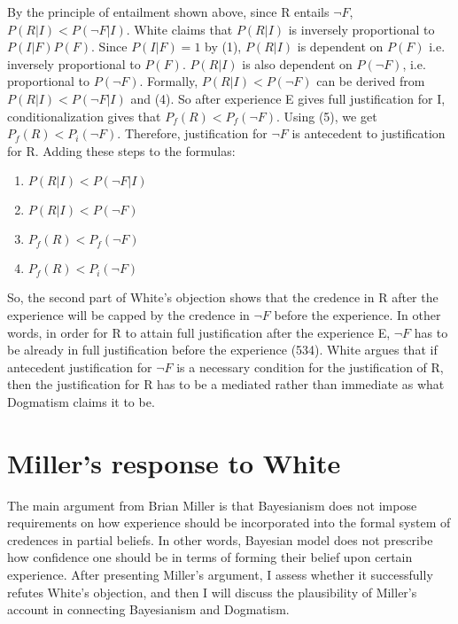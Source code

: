 By the principle of entailment shown above, since R entails \(\neg F\),
\(P(R|I) < P(\neg F|I)\). White claims that \(P(R|I)\) is inversely
proportional to \(P(I|F)P(F)\). Since \(P(I|F) = 1\) by (1), \(P(R|I)\)
is dependent on \(P(F)\) i.e. inversely proportional to \(P(F)\).
\(P(R|I)\) is also dependent on \(P(\neg F)\), i.e. proportional to
\(P(\neg F)\). Formally, \(P(R|I) < P(\neg F)\) can be derived from
\(P(R|I) < P(\neg F|I)\) and (4). So after experience E gives full
justification for I, conditionalization gives that
\(P_{f}(R) < P_{f}(\neg F)\). Using (5), we get
\(P_{f}(R) < P_{i}(\neg F)\). Therefore, justification for \(\neg F\) is
antecedent to justification for R. Adding these steps to the formulas:
\begin{enumerate}
	\item \(P(R|I) < P(\neg F|I)\)

	\item \(P(R|I) < P(\neg F)\)

	\item \(P_{f}(R) < P_{f}(\neg F)\)

	\item \(P_{f}(R) < P_{i}(\neg F)\)
\end{enumerate}
So, the second part of White's objection shows that the credence in R
after the experience will be capped by the credence in
$\neg F$ before the experience. In other words, in order for R
to attain full justification after the experience E, $\neg F$
has to be already in full justification before the experience (534).
White argues that if antecedent justification for $\neg F$ is
a necessary condition for the justification of R, then the justification
for R has to be a mediated rather than immediate as what Dogmatism
claims it to be.

\section{Miller's response to White}

The main argument from Brian Miller is that Bayesianism does not impose
requirements on how experience should be incorporated into the formal
system of credences in partial beliefs. In other words, Bayesian model
does not prescribe how confidence one should be in terms of forming
their belief upon certain experience. After presenting Miller's
argument, I assess whether it successfully refutes White's objection,
and then I will discuss the plausibility of Miller's account in
connecting Bayesianism and Dogmatism.

